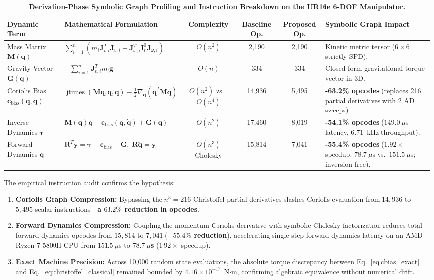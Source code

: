 \documentclass[fleqn,10pt]{article}
\begin{document}
	\begin{table}[!t]
		\caption{\textbf{Derivation-Phase Symbolic Graph Profiling and Instruction Breakdown on the UR16e 6-DOF Manipulator.}}
		\label{tab:table3_opcodes}
		\centering
		\small
		\begin{tabularx}{\textwidth}{p{2.3cm}p{4.1cm}ccc>{\raggedright\arraybackslash}X}
			\toprule
			\textbf{Dynamic Term} & \textbf{Mathematical Formulation} & \textbf{Complexity} & \textbf{Baseline Op.} & \textbf{Proposed Op.} & \textbf{Symbolic Graph Impact} \\
			\midrule
			Mass Matrix $\bm{M}(\bm{q})$ & $\sum_{i=1}^n (m_i \bm{J}_{v,i}^T \bm{J}_{v,i} + \bm{J}_{\omega,i}^T \bm{I}_i^0 \bm{J}_{\omega,i})$ & $O(n^2)$ & 2,190 & 2,190 & Kinetic metric tensor ($6 \times 6$ strictly SPD). \\
			Gravity Vector $\bm{G}(\bm{q})$ & $-\sum_{i=1}^n \bm{J}_{v,i}^T m_i \bm{g}$ & $O(n)$ & 334 & 334 & Closed-form gravitational torque vector in 3D. \\
			Coriolis Bias $\mathbf{c}_{\text{bias}}(\bm{q},\dot{\bm{q}})$ & $\operatorname{jtimes}(\bm{M}\dot{\bm{q}}, \bm{q}, \dot{\bm{q}}) - \frac{1}{2}\nabla_{\bm{q}}(\dot{\bm{q}}^T\bm{M}\dot{\bm{q}})$ & $O(n^2)$ vs.\ $O(n^4)$ & 14,936 & 5,495 & \textbf{-63.2\% opcodes} (replaces 216 partial derivatives with 2 AD sweeps). \\
			Inverse Dynamics $\bm{\tau}$ & $\bm{M}(\bm{q})\ddot{\bm{q}} + \mathbf{c}_{\text{bias}}(\bm{q},\dot{\bm{q}}) + \bm{G}(\bm{q})$ & $O(n^2)$ & 17,460 & 8,019 & \textbf{-54.1\% opcodes} ($149.0~\mu$s latency, $6.71$~kHz throughput). \\
			Forward Dynamics $\ddot{\bm{q}}$ & $\bm{R}^T \bm{y} = \bm{\tau} - \mathbf{c}_{\text{bias}} - \bm{G}, \; \bm{R}\ddot{\bm{q}} = \bm{y}$ & $O(n^3)$ Cholesky & 15,814 & 7,041 & \textbf{-55.4\% opcodes} ($1.92\times$ speedup: $78.7~\mu$s vs.\ $151.5~\mu$s; inversion-free). \\
			\bottomrule
		\end{tabularx}
	\end{table}
	
	The empirical instruction audit confirms the hypothesis:
	\begin{enumerate}
		\item \textbf{Coriolis Graph Compression:} Bypassing the $n^3 = 216$ Christoffel partial derivatives slashes Coriolis evaluation from $14,936$ to $5,495$ scalar instructions---\textbf{a $63.2\%$ reduction in opcodes}.
		\item \textbf{Forward Dynamics Compression:} Coupling the momentum Coriolis derivative with symbolic Cholesky factorization reduces total forward dynamics opcodes from $15,814$ to $7,041$ (\textbf{$-55.4\%$ reduction}), accelerating single-step forward dynamics latency on an AMD Ryzen 7 5800H CPU from $151.5~\mu$s to \textbf{$78.7~\mu$s} ($1.92\times$ speedup).
		\item \textbf{Exact Machine Precision:} Across 10,000 random state evaluations, the absolute torque discrepancy between Eq.~\eqref{eq:cbias_exact} and Eq.~\eqref{eq:christoffel_classical} remained bounded by $4.16 \times 10^{-17}$~N$\cdot$m, confirming algebraic equivalence without numerical drift.
	\end{enumerate}
	
\end{document}
